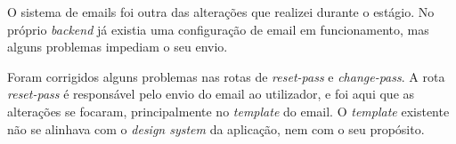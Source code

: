 


O sistema de emails foi outra das alterações que realizei durante o estágio. No próprio \textit{backend} já existia uma configuração de email em funcionamento, mas alguns problemas impediam o seu envio.

Foram corrigidos alguns problemas nas rotas de \textit{reset-pass} e \textit{change-pass}. A rota \textit{reset-pass} é responsável pelo envio do email ao utilizador, e foi aqui que as alterações se focaram, principalmente no \textit{template} do email. O \textit{template} existente não se alinhava com o \textit{design system} da aplicação, nem com o seu propósito.

